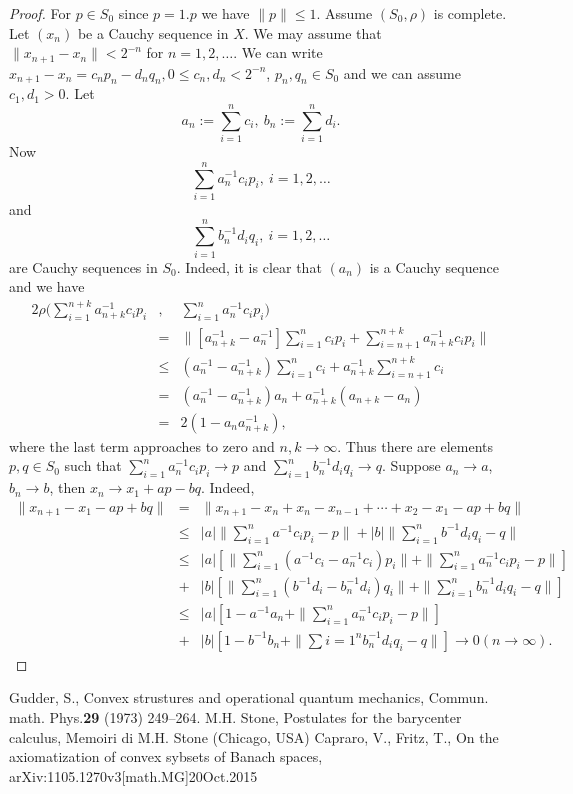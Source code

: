 \documentclass[12pt,letterpaper]{article}
\begin{document}
\begin{proof} For $p\in S_0$ since $p=1.p$ we have $\|p\|\leq 1$. Assume $(S_0,\rho)$ is complete. Let $(x_n)$ be a Cauchy sequence in $X$. We may assume that $\|x_{n+1}-x_n\|< 2^{-n}$ for $n=1,2,\ldots$. We can write $x_{n+1}-x_n=c_np_n-d_nq_n, 0\leq c_n,d_n<2^{-n}$, $p_n,q_n\in S_0$ and we can assume $c_1,d_1>0$. Let
\[
a_n:=\sum_{i=1}^nc_i, \ b_n:=\sum_{i=1}^nd_i.
\]
Now
\[
\sum_{i=1}^na_n^{-1}c_ip_i, \ i=1,2,\ldots
\]
and
\[
\sum_{i=1}^nb_n^{-1}d_iq_i, \ i=1,2,\ldots
\]
are Cauchy sequences in $S_0$. Indeed, it is clear that $(a_n)$ is a Cauchy sequence
and we have
\begin{eqnarray*}
2\rho(\sum_{i=1}^{n+k}a_{n+k}^{-1}c_ip_i&,&\sum_{i=1}^na_n^{-1}c_ip_i)\\
&=&\|[a_{n+k}^{-1}-a_n^{-1}]\sum_{i=1}^nc_ip_i+\sum_{i=n+1}^{n+k}a_{n+k}^{-1}c_ip_i\|\\
&\leq&(a_n^{-1}-a_{n+k}^{-1})\sum_{i=1}^nc_i+a_{n+k}^{-1}\sum_{i=n+1}^{n+k}c_i\\
&=&(a_n^{-1}-a_{n+k}^{-1})a_n+a_{n+k}^{-1}(a_{n+k}-a_n)\\
&=& 2(1-a_na_{n+k}^{-1}),
\end{eqnarray*}
where the last term approaches to zero and $n,k \to \infty$. Thus there are elements $p,q\in S_0$ such that $\sum_{i=1}^na_n^{-1}c_ip_i \to p$ and $\sum_{i=1}^nb_n^{-1}d_iq_i \to q$.
Suppose $a_n \to a$, $b_n \to b$, then $x_n \to x_1+ap-bq$. Indeed,
\begin{eqnarray*}
\|x_{n+1}-x_1-ap+bq\|&=&\|x_{n+1}-x_n+x_n-x_{n-1}+\cdots +x_2-x_1-ap+bq\|\\
&\leq&|a|\|\sum_{i=1}^na^{-1}c_ip_i-p\|+|b|\|\sum_{i=1}^nb^{-1}d_iq_i-q\|\\
&\leq& |a|[\|\sum_{i=1}^n(a^{-1}c_i-a_n^{-1}c_i)p_i\|+\|\sum_{i=1}^na_n^{-1}c_ip_i-p\|]\\
&+&|b|[\|\sum_{i=1}^n(b^{-1}d_i-b_n^{-1}d_i)q_i\|+\|\sum_{i=1}^nb_n^{-1}d_iq_i-q\|]\\
&\leq&|a|[1-a^{-1}a_n+\|\sum_{i=1}^na_n^{-1}c_ip_i-p\|]\\
&+&|b|[1-b^{-1}b_n+\|\sum{i=1}^nb_n^{-1}d_iq_i-q\|] \to 0 (n \to \infty).
\end{eqnarray*}

\end{proof}


\begin{thebibliography}{WWW}
 Gudder, S., Convex strustures and operational quantum mechanics, Commun. math. Phys.{\bf 29} (1973) 249--264.
 M.H. Stone, Postulates for the barycenter calculus, Memoiri di M.H. Stone (Chicago, USA)
 Capraro, V., Fritz, T., On the axiomatization of convex sybsets of Banach spaces, arXiv:1105.1270v3[math.MG]20Oct.2015
\end{thebibliography}
\end{document}
